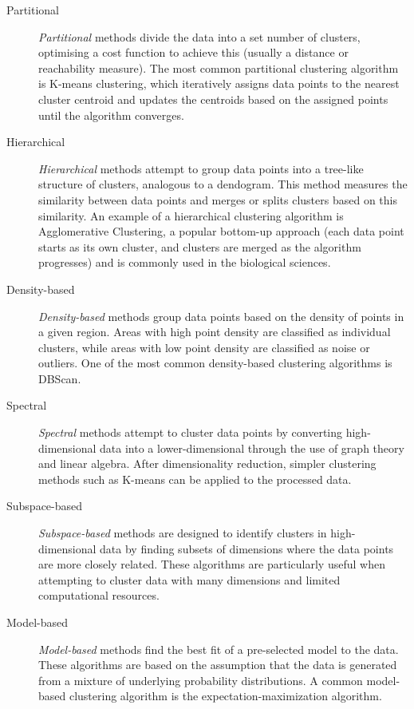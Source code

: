 \begin{description}

    \item[Partitional]
    \emph{Partitional} methods divide the data into a set number of clusters, optimising a cost function to achieve this (usually a distance or reachability measure). The most common partitional clustering algorithm is K-means clustering, which iteratively assigns data points to the nearest cluster centroid and updates the centroids based on the assigned points until the algorithm converges. 

    \item[Hierarchical]
    \emph{Hierarchical} methods attempt to group data points into a tree-like structure of clusters, analogous to a dendogram. This method measures the similarity between data points and merges or splits clusters based on this similarity. An example of a hierarchical clustering algorithm is Agglomerative Clustering, a popular bottom-up approach (each data point starts as its own cluster, and clusters are merged as the algorithm progresses) and is commonly used in the biological sciences.

    \item[Density-based]
    \emph{Density-based} methods group data points based on the density of points in a given region. Areas with high point density are classified as individual clusters, while areas with low point density are classified as noise or outliers. One of the most common density-based clustering algorithms is \ac{DBScan}.

    \item[Spectral]
    \emph{Spectral} methods attempt to cluster data points by converting high-dimensional data into a lower-dimensional through the use of graph theory and linear algebra. After dimensionality reduction, simpler clustering methods such as K-means can be applied to the processed data.

    \item[Subspace-based]
    \emph{Subspace-based} methods are designed to identify clusters in high-dimensional data by finding subsets of dimensions where the data points are more closely related. These algorithms are particularly useful when attempting to cluster data with many dimensions and limited computational resources.

    \item[Model-based]
    \emph{Model-based} methods find the best fit of a pre-selected model to the data. These algorithms are based on the assumption that the data is generated from a mixture of underlying probability distributions. A common model-based clustering algorithm is the expectation-maximization algorithm.
    
\end{description}

